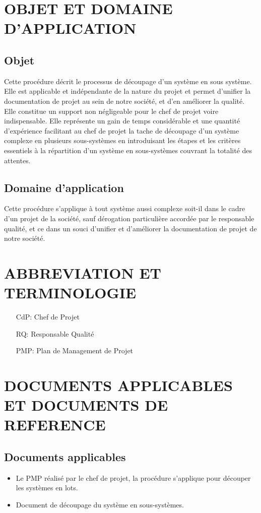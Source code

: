 \section{OBJET ET DOMAINE D'APPLICATION}
\subsection{Objet}
Cette procédure décrit le processus de découpage d'un système en sous système.
Elle est applicable et indépendante de la nature du projet et permet d'unifier la documentation de projet 
au sein de notre société, et d'en améliorer la qualité. Elle constitue un support non négligeable pour le chef de projet voire
indispensable. Elle représente un gain de temps considérable et une quantité d'expérience facilitant au chef de projet la tache de découpage 
d'un système complexe en plusieurs sous-systèmes en introduisant les étapes et les critères essentiels à la répartition d'un système en sous-systèmes
couvrant la totalité des attentes.

\subsection{Domaine d'application}
Cette procédure s'applique à tout système aussi complexe soit-il dans le cadre d'un projet de la société, sauf dérogation particulière accordée par le responsable qualité,
et ce dans un souci d'unifier et d'améliorer la documentation de projet de notre société.


\section{ABBREVIATION ET TERMINOLOGIE}

\begin{itemize}
\item[CdP:] Chef de Projet
\item[RQ: ] Responsable Qualité
\item[PMP: ] Plan de Management de Projet
\end{itemize}


\section{DOCUMENTS APPLICABLES ET DOCUMENTS DE REFERENCE}
\subsection{Documents applicables}
\begin{itemize}
\item Le PMP réalisé par le chef de projet, la procédure s'applique pour découper les systèmes en lots.
\item Document de découpage du système en sous-systèmes.
\end{itemize}


